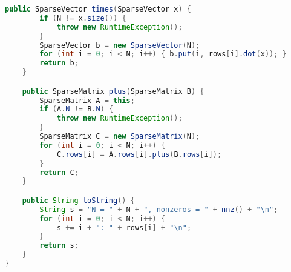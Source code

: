 \documentclass[8pt,a4paper,compress]{beamer}
\begin{document}
\begin{frame}[fragile]
\pause

\begin{lstlisting}[language=java,style=focusin]
    public SparseVector times(SparseVector x) {
        if (N != x.size()) {
            throw new RuntimeException();
        }
        SparseVector b = new SparseVector(N);
        for (int i = 0; i < N; i++) { b.put(i, rows[i].dot(x)); }
        return b;
    }

    public SparseMatrix plus(SparseMatrix B) {
        SparseMatrix A = this;
        if (A.N != B.N) { 
            throw new RuntimeException(); 
        }
        SparseMatrix C = new SparseMatrix(N);
        for (int i = 0; i < N; i++) { 
            C.rows[i] = A.rows[i].plus(B.rows[i]); 
        }
        return C;
    }

    public String toString() {
        String s = "N = " + N + ", nonzeros = " + nnz() + "\n";
        for (int i = 0; i < N; i++) {
            s += i + ": " + rows[i] + "\n";
        }
        return s;
    }
}
\end{lstlisting}
\end{frame}
\end{document}
